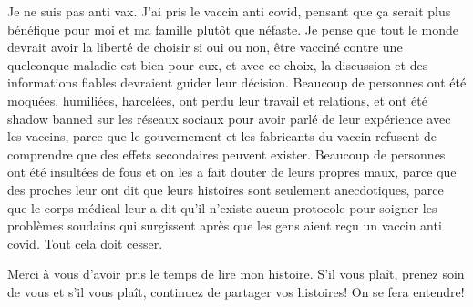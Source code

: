 Je ne suis pas anti vax. J'ai pris le vaccin anti covid, pensant que ça serait
plus bénéfique pour moi et ma famille plutôt que néfaste. Je pense que tout le
monde devrait avoir la liberté de choisir si oui ou non, être vacciné contre une
quelconque maladie est bien pour eux, et avec ce choix, la discussion et des
informations fiables devraient guider leur décision. Beaucoup de personnes ont
été moquées, humiliées, harcelées, ont perdu leur travail et relations, et ont été
shadow banned sur les réseaux sociaux pour avoir parlé de leur expérience avec
les vaccins, parce que le gouvernement et les fabricants du vaccin refusent de
comprendre que des effets secondaires peuvent exister. Beaucoup de personnes ont
été insultées de fous et on les a fait douter de leurs propres maux, parce que des
proches leur ont dit que leurs histoires sont seulement anecdotiques, parce que
le corps médical leur a dit qu'il n'existe aucun protocole pour soigner les
problèmes soudains qui surgissent après que les gens aient reçu un vaccin anti
covid. Tout cela doit cesser.

Merci à vous d'avoir pris le temps de lire mon histoire. S'il vous plaît, prenez
soin de vous et s'il vous plaît, continuez de partager vos histoires! On se fera
entendre!

